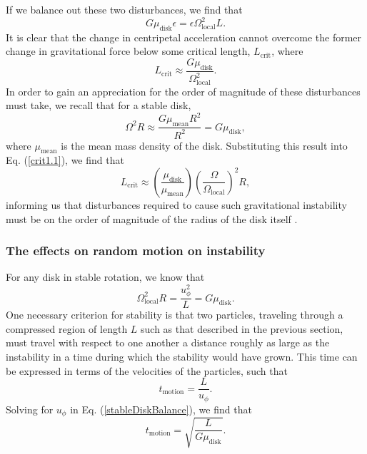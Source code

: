 \documentclass[aps,pra,twocolumn]{revtex4-1}
\begin{document}
If we balance out these two disturbances, we find that 
\begin{equation}
G \mu_\text{disk} \epsilon = \epsilon \Omega_\text{local}^2 L.
\end{equation}
It is clear that the change in centripetal acceleration cannot overcome the former change in gravitational force below some critical length, $L_\text{crit}$, where
\begin{equation}
L_\text{crit} \approx \frac{G \mu_\text{disk}}{\Omega_\text{local}^2}. \label{crit1.1}
\end{equation}
In order to gain an appreciation for the order of magnitude of these disturbances must take, we recall that for a stable disk,
\begin{equation}
\Omega^2 R \approx \frac{G\mu_\text{mean} R^2}{R^2} = G\mu_\text{disk},
\end{equation}
where $\mu_\text{mean}$ is the mean mass density of the disk.  Substituting this result into Eq. (\ref{crit1.1}), we find that
\begin{equation}
L_\text{crit} \approx \left(\frac{\mu_\text{disk}}{\mu_\text{mean}}\right)\left(\frac{\Omega}{\Omega_\text{local}}\right)^2 R,
\end{equation}
informing us that disturbances required to cause such gravitational instability must be on the order of magnitude of the radius of the disk itself \cite{toomre1964}.

\subsubsection{\label{section 3.1.2} The effects on random motion on instability}
For any disk in stable rotation, we know that
\begin{equation}
\Omega_\text{local}^2 R = \frac{u_{\phi}^2}{L} = G \mu_\text{disk}. \label{stableDiskBalance}
\end{equation}
One necessary criterion for stability is that two particles, traveling through a compressed region of length $L$ such as that described in the previous section, must travel with respect to one another a distance roughly as large as the instability in a time during which the stability would have grown.  This time can be expressed in terms of the velocities of the particles, such that 
\begin{equation}
t_\text{motion} = \frac{L}{u_\phi}.
\end{equation}
Solving for $u_\phi$ in Eq. (\ref{stableDiskBalance}), we find that
\begin{equation}
t_\text{motion} = \sqrt{\frac{L}{G\mu_\text{disk}}}.
\end{equation}
\end{document}
